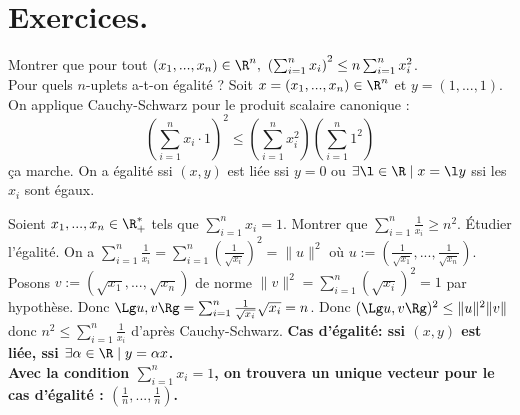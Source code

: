 \documentclass[11pt]{article}
\begin{document}
\section{Exercices.}

\begin{exercice}{37.6}{}
    Montrer que pour tout $(x_1,...,x_n)\in\R^n,~\left( \sum_{i=1}^nx_i \right)^2\leq n\sum_{i=1}^nx_i^2$.\\
    Pour quels $n$-uplets a-t-on égalité ?
    \tcblower
    Soit $x=(x_1,...,x_n)\in\R^n$ et $y=(1,...,1)$. On applique Cauchy-Schwarz pour le produit scalaire canonique :
    \begin{equation*}
        \left( \sum_{i=1}^nx_i\cdot1 \right)^2 \leq \left(\sum_{i=1}^nx_i^2\right)\left(\sum_{i=1}^n1^2\right)
    \end{equation*}
    ça marche.\n
    On a égalité ssi $(x,y)$ est liée ssi $y=0$ ou $\exists\l\in\R\mid x=\l y$ ssi les $x_i$ sont égaux.
\end{exercice}

\begin{exercice}{37.7}{}
    Soient $x_1,...,x_n\in\R_+^*$ tels que $\sum_{i=1}^nx_i=1$. Montrer que $\sum_{i=1}^n\frac{1}{x_i}\geq n^2$. Étudier l'égalité.
    \tcblower
    On a $\sum_{i=1}^n\frac{1}{x_i}=\sum_{i=1}^n\left( \frac{1}{\sqrt{x_i}} \right)^2=\|u\|^2$ où $u:=(\frac{1}{\sqrt{x_1}},...,\frac{1}{\sqrt{x_n}})$.\n
    Posons $v:=(\sqrt{x_1},...,\sqrt{x_n})$ de norme $\|v\|^2=\sum_{i=1}^n(\sqrt{x_i})^2=1$ par hypothèse.\n
    Donc $\Lg u,v \Rg = \sum_{i=1}^n\frac{1}{\sqrt{x_i}}\sqrt{x_i}=n$.\n
    Donc $(\Lg u,v\Rg)^2\leq\|u\|^2\|v\|$ donc $n^2\leq\sum_{i=1}^n\frac{1}{x_i}$ d'après Cauchy-Schwarz.\n
    \bf{Cas d'égalité:} ssi $(x,y)$ est liée, ssi $\exists \alpha \in \R \mid y = \alpha x$.\\
    Avec la condition $\sum_{i=1}^nx_i=1$, on trouvera un unique vecteur pour le cas d'égalité : $(\frac{1}{n},...,\frac{1}{n})$.
\end{exercice}
\end{document}
